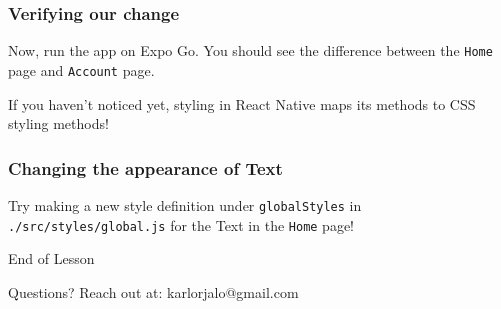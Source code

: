 \documentclass{beamer}
\begin{document}
  \begin{frame}[fragile]
    \frametitle{Verifying our change}

    Now, run the app on Expo Go. 
    You should see the difference between the \verb|Home| page and \verb|Account| page. 

    If you haven't noticed yet, styling in React Native maps its methods to CSS styling methods!
  \end{frame}

  \begin{frame}[fragile]
    \frametitle{Changing the appearance of Text}

    Try making a new style definition under \verb|globalStyles| in \verb|./src/styles/global.js| for the Text in the \verb|Home| page!
  \end{frame}

  \appendix

  \begin{frame}[standout]
    End of Lesson

    {\small Questions? Reach out at:}
    {\footnotesize karlorjalo@gmail.com}
  \end{frame}
\end{document}
